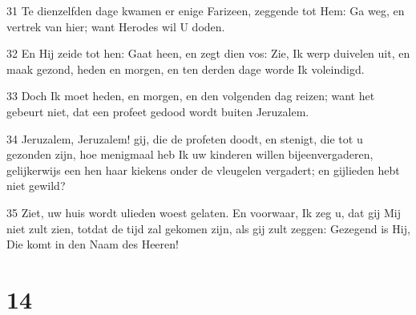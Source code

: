 \par 31 Te dienzelfden dage kwamen er enige Farizeen, zeggende tot Hem: Ga weg, en vertrek van hier; want Herodes wil U doden.
\par 32 En Hij zeide tot hen: Gaat heen, en zegt dien vos: Zie, Ik werp duivelen uit, en maak gezond, heden en morgen, en ten derden dage worde Ik voleindigd.
\par 33 Doch Ik moet heden, en morgen, en den volgenden dag reizen; want het gebeurt niet, dat een profeet gedood wordt buiten Jeruzalem.
\par 34 Jeruzalem, Jeruzalem! gij, die de profeten doodt, en stenigt, die tot u gezonden zijn, hoe menigmaal heb Ik uw kinderen willen bijeenvergaderen, gelijkerwijs een hen haar kiekens onder de vleugelen vergadert; en gijlieden hebt niet gewild?
\par 35 Ziet, uw huis wordt ulieden woest gelaten. En voorwaar, Ik zeg u, dat gij Mij niet zult zien, totdat de tijd zal gekomen zijn, als gij zult zeggen: Gezegend is Hij, Die komt in den Naam des Heeren!

\chapter{14}

